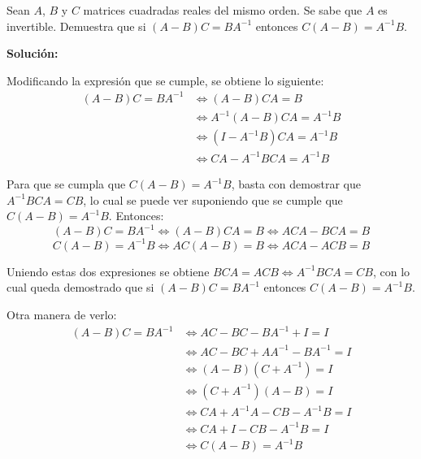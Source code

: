 \documentclass[../../main.tex]{subfiles}
\begin{document}
  \begin{shaded}
    Sean $A$, $B$ y $C$ matrices cuadradas reales del mismo orden. Se sabe que $A$ es invertible. Demuestra que si $(A - B) C = B A^{-1}$ entonces $C (A - B) = A^{-1} B$.
  \end{shaded}

  \textbf{Solución:}

  Modificando la expresión que se cumple, se obtiene lo siguiente:
  \begin{equation*}
    \begin{split}
      (A - B) C = B A^{-1} & \iff
      (A - B) C A = B \\ & \iff
      A^{-1} (A - B) C A = A^{-1} B \\ & \iff
      (I - A^{-1} B) C A = A^{-1} B \\ & \iff
      C A - A^{-1} B C A = A^{-1} B
    \end{split}
  \end{equation*}

  Para que se cumpla que $C (A - B) = A^{-1} B$, basta con demostrar que $A^{-1} B C A = C B$, lo cual se puede ver suponiendo que se cumple que $C (A - B) = A^{-1} B$. Entonces:
  $$
  (A - B) C = B A^{-1} \iff (A - B) C A = B \iff A C A - B C A = B
  $$
  $$
  C (A - B) = A^{-1} B \iff A C (A - B) = B \iff A C A - A C B = B
  $$

  Uniendo estas dos expresiones se obtiene $B C A = A C B \iff A^{-1} B C A = C B$, con lo cual queda demostrado que si $(A - B) C = B A^{-1}$ entonces $C (A - B) = A^{-1} B$.

  Otra manera de verlo:
  \begin{equation*}
    \begin{split}
      (A - B) C = B A^{-1} & \iff
      A C - B C - B A^{-1} + I = I \\ & \iff
      A C - B C + A A^{-1} - B A^{-1} = I \\ & \iff
      (A - B) (C + A^{-1}) = I \\ & \iff
      (C + A^{-1}) (A - B) = I \\ & \iff
      C A + A^{-1} A - C B - A^{-1} B = I \\ & \iff
      C A + I - C B - A^{-1} B = I \\ & \iff
      C (A - B) = A^{-1} B
    \end{split}
  \end{equation*}
\end{document}
